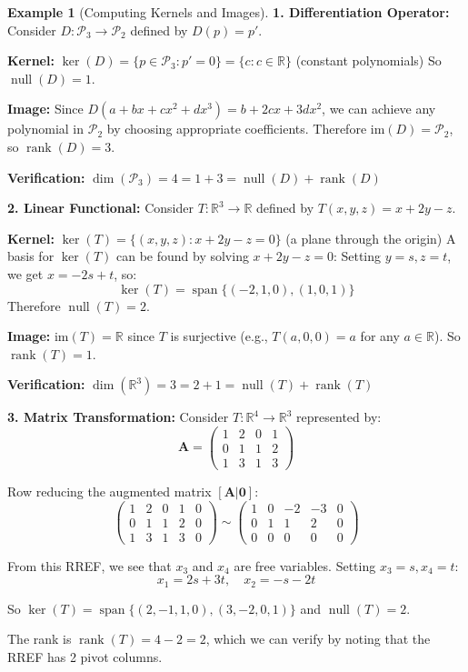 \documentclass[12pt]{article}
\numberwithin{equation}{section}
\newcommand{\vect}[1]{\boldsymbol{#1}}   %
\newcommand{\mat}[1]{\mathbf{#1}}        %
\newcommand{\Span}{\operatorname{span}}
\newcommand{\rank}{\operatorname{rank}}
\newcommand{\nullity}{\operatorname{null}}
\theoremstyle{plain}
\theoremstyle{definition}
\newtheorem{example}[theorem]{Example}
\theoremstyle{remark}
\begin{document}
\begin{example}[Computing Kernels and Images]
\textbf{1. Differentiation Operator:}
Consider $D: \mathcal{P}_3 \to \mathcal{P}_2$ defined by $D(p) = p'$.

\textbf{Kernel:} $\ker(D) = \{p \in \mathcal{P}_3 : p' = 0\} = \{c : c \in \mathbb{R}\}$ (constant polynomials)
So $\nullity(D) = 1$.

\textbf{Image:} Since $D(a + bx + cx^2 + dx^3) = b + 2cx + 3dx^2$, we can achieve any polynomial in $\mathcal{P}_2$ by choosing appropriate coefficients. Therefore $\text{im}(D) = \mathcal{P}_2$, so $\rank(D) = 3$.

\textbf{Verification:} $\dim(\mathcal{P}_3) = 4 = 1 + 3 = \nullity(D) + \rank(D)$ \checkmark

\textbf{2. Linear Functional:}
Consider $T: \mathbb{R}^3 \to \mathbb{R}$ defined by $T(x, y, z) = x + 2y - z$.

\textbf{Kernel:} $\ker(T) = \{(x, y, z) : x + 2y - z = 0\}$ (a plane through the origin)
A basis for $\ker(T)$ can be found by solving $x + 2y - z = 0$:
Setting $y = s, z = t$, we get $x = -2s + t$, so:
$$\ker(T) = \Span\{(-2, 1, 0), (1, 0, 1)\}$$
Therefore $\nullity(T) = 2$.

\textbf{Image:} $\text{im}(T) = \mathbb{R}$ since $T$ is surjective (e.g., $T(a, 0, 0) = a$ for any $a \in \mathbb{R}$).
So $\rank(T) = 1$.

\textbf{Verification:} $\dim(\mathbb{R}^3) = 3 = 2 + 1 = \nullity(T) + \rank(T)$ \checkmark

\textbf{3. Matrix Transformation:}
Consider $T: \mathbb{R}^4 \to \mathbb{R}^3$ represented by:
$$\mat{A} = \begin{pmatrix} 1 & 2 & 0 & 1 \\ 0 & 1 & 1 & 2 \\ 1 & 3 & 1 & 3 \end{pmatrix}$$

Row reducing the augmented matrix $[\mat{A}|\vect{0}]$:
$$\begin{pmatrix} 1 & 2 & 0 & 1 & 0 \\ 0 & 1 & 1 & 2 & 0 \\ 1 & 3 & 1 & 3 & 0 \end{pmatrix} \sim \begin{pmatrix} 1 & 0 & -2 & -3 & 0 \\ 0 & 1 & 1 & 2 & 0 \\ 0 & 0 & 0 & 0 & 0 \end{pmatrix}$$

From this RREF, we see that $x_3$ and $x_4$ are free variables. Setting $x_3 = s, x_4 = t$:
$$x_1 = 2s + 3t, \quad x_2 = -s - 2t$$

So $\ker(T) = \Span\{(2, -1, 1, 0), (3, -2, 0, 1)\}$ and $\nullity(T) = 2$.

The rank is $\rank(T) = 4 - 2 = 2$, which we can verify by noting that the RREF has 2 pivot columns.
\end{example}
\end{document}
